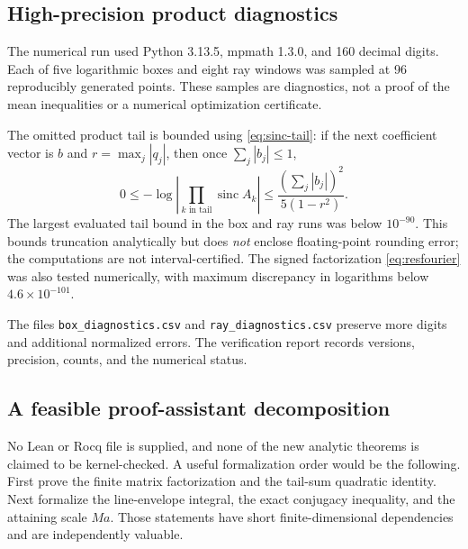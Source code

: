 \documentclass[11pt,a4paper]{article}
\numberwithin{equation}{section}
\theoremstyle{definition}
\theoremstyle{remark}\newtheorem{remark}[theorem]{Remark}
\newcommand{\sinc}{\operatorname{sinc}}
\begin{document}
\subsection{High-precision product diagnostics}

The numerical run used Python 3.13.5, mpmath 1.3.0, and 160 decimal digits.
Each of five logarithmic boxes and eight ray windows was sampled at 96
reproducibly generated points. These samples are diagnostics, not a proof of
the mean inequalities or a numerical optimization certificate.

The omitted product tail is bounded using \eqref{eq:sinc-tail}:
if the next coefficient vector is $b$ and $r=\max_j|q_j|$, then once
$\sum_j|b_j|\le1$,
\begin{equation}
 0\le-\log\left|\prod_{k\text{ in tail}}\sinc A_k\right|
      \le\frac{(\sum_j|b_j|)^2}{5(1-r^2)}.
 \label{eq:numericaltail}
\end{equation}
The largest evaluated tail bound in the box and ray runs was below
$10^{-90}$. This bounds truncation analytically but does \emph{not} enclose
floating-point rounding error; the computations are not interval-certified.
The signed factorization \eqref{eq:resfourier} was also tested numerically,
with maximum discrepancy in logarithms below $4.6\times10^{-101}$.

\begin{table}[htbp]
\centering\small

\caption{The family $\lambda=(1,2,4)$, $\alpha=k(2,1,2)$.
The witness is $\sum_j\alpha_j\log t_j+\log|\Phi(t)|-\log W$, with the
omitted-tail loss subtracted. Analytically it lower-bounds the logarithm of
every $L^p$ derivative norm at that frequency; the displayed numerical
values themselves have not been interval-enclosed.}
\label{tab:diagnostics}
\end{table}

The files \texttt{box\_diagnostics.csv} and \texttt{ray\_diagnostics.csv}
preserve more digits and additional normalized errors. The verification
report records versions, precision, counts, and the numerical status.

\subsection{A feasible proof-assistant decomposition}

No Lean or Rocq file is supplied, and none of the new analytic theorems is
claimed to be kernel-checked. A useful formalization order would be the
following. First prove the finite matrix factorization and the tail-sum
quadratic identity. Next formalize the line-envelope integral, the exact
conjugacy inequality, and the attaining scale $Ma$. Those statements have
short finite-dimensional dependencies and are independently valuable.
\end{document}

